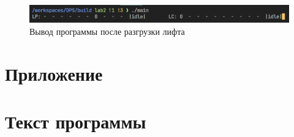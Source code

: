 \begin{figure}[H]
    \centering
    \includegraphics[width=0.8\linewidth]{images/lab2_output3.png}
    \caption{Вывод программы после разгрузки лифта}
    \label{fig:output3}
\end{figure}

\newpage

\appendix

\section*{Приложение}
\section*{Текст программы}

